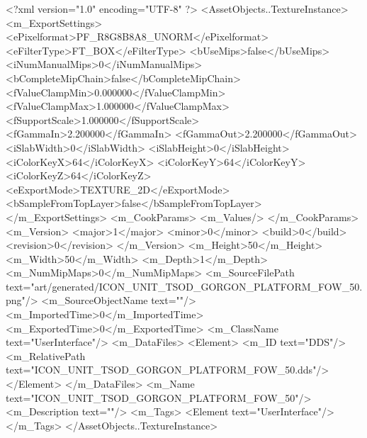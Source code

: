 <?xml version="1.0" encoding="UTF-8" ?>
<AssetObjects..TextureInstance>
	<m_ExportSettings>
		<ePixelformat>PF_R8G8B8A8_UNORM</ePixelformat>
		<eFilterType>FT_BOX</eFilterType>
		<bUseMips>false</bUseMips>
		<iNumManualMips>0</iNumManualMips>
		<bCompleteMipChain>false</bCompleteMipChain>
		<fValueClampMin>0.000000</fValueClampMin>
		<fValueClampMax>1.000000</fValueClampMax>
		<fSupportScale>1.000000</fSupportScale>
		<fGammaIn>2.200000</fGammaIn>
		<fGammaOut>2.200000</fGammaOut>
		<iSlabWidth>0</iSlabWidth>
		<iSlabHeight>0</iSlabHeight>
		<iColorKeyX>64</iColorKeyX>
		<iColorKeyY>64</iColorKeyY>
		<iColorKeyZ>64</iColorKeyZ>
		<eExportMode>TEXTURE_2D</eExportMode>
		<bSampleFromTopLayer>false</bSampleFromTopLayer>
	</m_ExportSettings>
	<m_CookParams>
		<m_Values/>
	</m_CookParams>
	<m_Version>
		<major>1</major>
		<minor>0</minor>
		<build>0</build>
		<revision>0</revision>
	</m_Version>
	<m_Height>50</m_Height>
	<m_Width>50</m_Width>
	<m_Depth>1</m_Depth>
	<m_NumMipMaps>0</m_NumMipMaps>
	<m_SourceFilePath text="art/generated/ICON_UNIT_TSOD_GORGON_PLATFORM_FOW_50.png"/>
	<m_SourceObjectName text=""/>
	<m_ImportedTime>0</m_ImportedTime>
	<m_ExportedTime>0</m_ExportedTime>
	<m_ClassName text="UserInterface"/>
	<m_DataFiles>
		<Element>
			<m_ID text="DDS"/>
			<m_RelativePath text="ICON_UNIT_TSOD_GORGON_PLATFORM_FOW_50.dds"/>
		</Element>
	</m_DataFiles>
	<m_Name text="ICON_UNIT_TSOD_GORGON_PLATFORM_FOW_50"/>
	<m_Description text=""/>
	<m_Tags>
		<Element text="UserInterface"/>
	</m_Tags>
</AssetObjects..TextureInstance>
